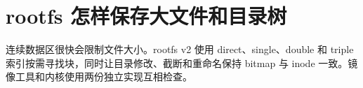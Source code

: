 \chapter{rootfs 怎样保存大文件和目录树}

连续数据区很快会限制文件大小。rootfs v2 使用 direct、single、double 和
triple 索引按需寻找块，同时让目录修改、截断和重命名保持 bitmap 与 inode
一致。镜像工具和内核使用两份独立实现互相检查。



